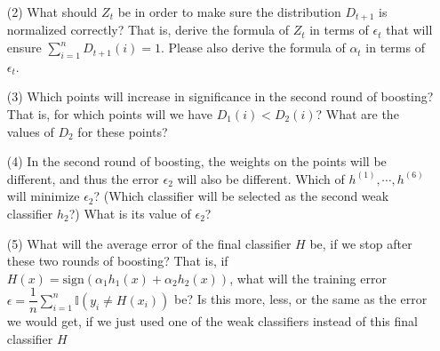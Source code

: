 \begin{itemize}
\begin{enumerate}
    \item[(2)] What should $Z_{t}$ be in order to make sure the distribution $D_{t+1}$ is normalized correctly? That is, derive the formula of $Z_{t}$ in terms of $\epsilon_{t}$ that will ensure $\sum\limits_{i=1}^{n} D_{t+1}(i) = 1$. Please also derive the formula of $\alpha_{t}$ in terms of $\epsilon_{t}$. ~

    \item[(3)] Which points will increase in significance in the second round of boosting? That is, for which points will we have $D_{1}(i) < D_{2}(i)$? What are the values of $D_{2}$ for these points? ~

    \item[(4)] In the second round of boosting, the weights on the points will be different, and thus the error $\epsilon_2$ will also be different. Which of $h^{(1)}, \cdots, h^{(6)}$ will minimize $\epsilon_2$? (Which classifier will be selected as the second weak classifier $h_2$?) What is its value of $\epsilon_2$? ~

    \item[(5)] What will the average error of the final classifier $H$ be, if we stop after these two rounds of boosting? That is, if $H(x) = \text{sign}(\alpha_{1}h_{1}(x) + \alpha_{2}h_{2}(x))$, what will the  training error $\epsilon = \dfrac{1}{n} \sum\limits_{i=1}^{n} \mathbb{I} (y_{i} \neq H(x_{i}))$ be? Is this more, less, or the same as the error we would get, if we just used one of the weak classifiers instead of this final classifier $H$ ~

\end{enumerate}
\end{itemize}

\solution




















\newpage